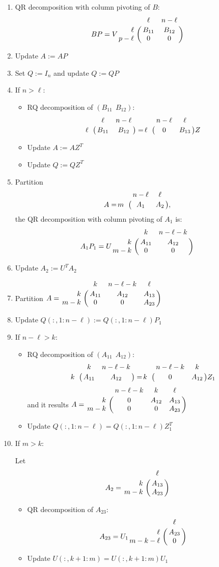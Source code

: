 \begin{enumerate}[(1)]
\item QR decomposition with column pivoting of $B$:
\[
BP = V\bordermatrix{ & \ell & n-\ell \cr
\hfill \ell & B_{11} & B_{12} \cr
\hfill p-\ell & 0 & 0 \cr}
\]

\item Update $A := AP$
\item Set $Q := I_n$ and update $Q := QP$

\item If $n > \ell$:
\begin{itemize}
\item RQ decomposition of $(B_{11} \ \ B_{12})$:
\[
\bordermatrix{ & \ell & n-\ell \cr
\hfill \ell & B_{11} & B_{12} \cr}
= \bordermatrix{ & n-\ell & \ell \cr
\hfill \ell & 0 & B_{13} \cr}Z
\]
\item Update $A := AZ^{T}$
\item Update $Q := QZ^{T}$
\end{itemize}

\item Partition
\[
A = \bordermatrix{ & n-\ell & \ell \cr
\hfill m & A_{1} & A_{2} \cr},
\]
the QR decomposition with column pivoting of $A_1$ is:
\[
A_{1}P_{1} = 
U\bordermatrix{ & k & n-\ell-k \cr
\hfill k & A_{11} & A_{12} \cr
\hfill m-k & 0 & 0 \cr}
\]
\item Update $A_{2} := U^{T}A_{2}$ 

\item Partition 
$A = \bordermatrix{ 
           & k & n-\ell-k & \ell \cr
\hfill k   & A_{11} & A_{12} & A_{13} \cr
\hfill m-k & 0      & 0      & A_{23} \cr}$

\item Update $Q(:, 1:n-\ell) := Q(:, 1:n-\ell)P_{1}$

\item If $n-\ell > k$:
\begin{itemize}
\item RQ decomposition of $(A_{11} \ \ A_{12})$:
\[
\bordermatrix{ & k & n-\ell-k \cr
\hfill k & A_{11} & A_{12} \cr}
= \bordermatrix{ & n-\ell-k & k \cr
\hfill k & 0 & A_{12} \cr}Z_{1}
\]
and it results 
$A = \bordermatrix{ 
           & n-\ell-k & k  & \ell \cr
\hfill k   & 0 & A_{12} & A_{13} \cr
\hfill m-k & 0      & 0      & A_{23} \cr}$


\item Update $Q(:,1:n-\ell) = Q(:, 1:n-\ell) Z_{1}^{T}$
\end{itemize}

\item If $m > k$:

Let 
\[
A_{2} = \bordermatrix{ & \ell  \cr
\hfill k & A_{13}  \cr
\hfill m-k & A_{23} \cr}
\]
\begin{itemize}
\item QR decomposition of $A_{23}$:
\[
A_{23} = U_{1}\bordermatrix{ & \ell  \cr
\hfill \ell & A_{23}  \cr
\hfill m-k-\ell & 0 \cr}
\]
\item Update $U(:,k+1:m) = U(:,k+1:m)U_{1}$
\end{itemize}    
\end{enumerate}
